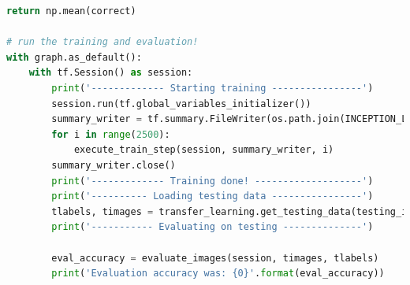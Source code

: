 \documentclass[hyperref]{article}
\theoremstyle{nonumberplain}
\begin{document}
\begin{appendices}
\begin{lstlisting}[language=Python]
    return np.mean(correct)

# run the training and evaluation!
with graph.as_default():
    with tf.Session() as session:
        print('------------- Starting training ----------------')
        session.run(tf.global_variables_initializer())
        summary_writer = tf.summary.FileWriter(os.path.join(INCEPTION_LOG_DIR, 'retrained'), graph)
        for i in range(2500):
            execute_train_step(session, summary_writer, i)
        summary_writer.close()
        print('------------- Training done! -------------------')
        print('---------- Loading testing data ----------------')
        tlabels, timages = transfer_learning.get_testing_data(testing_images)
        print('----------- Evaluating on testing --------------')

        eval_accuracy = evaluate_images(session, timages, tlabels)
        print('Evaluation accuracy was: {0}'.format(eval_accuracy))


\end{lstlisting}

\end{appendices}
\end{document}

